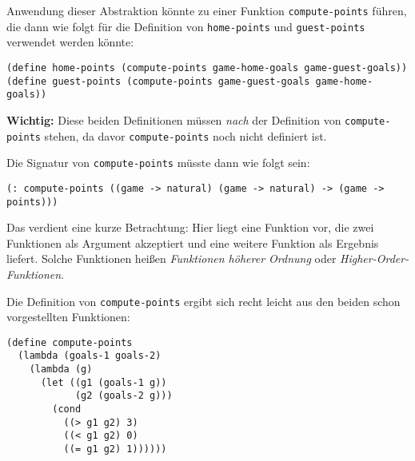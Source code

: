 Anwendung dieser Abstraktion könnte zu einer Funktion \texttt{compute-points}
führen, die dann wie folgt für die Definition von \texttt{home-points} und
\texttt{guest-points} verwendet werden könnte:

\begin{verbatim}
(define home-points (compute-points game-home-goals game-guest-goals))
(define guest-points (compute-points game-guest-goals game-home-goals))
\end{verbatim}
%
\textbf{Wichtig:} Diese beiden Definitionen müssen \emph{nach} der
Definition von \texttt{compute-points} stehen, da davor
\texttt{compute-points} noch nicht definiert ist.

Die Signatur von \texttt{compute-points} müsste dann wie folgt sein:
\begin{verbatim}
(: compute-points ((game -> natural) (game -> natural) -> (game -> points)))
\end{verbatim}
Das verdient eine kurze Betrachtung: Hier liegt eine Funktion vor, die zwei
Funktionen als Argument akzeptiert und eine weitere Funktion als Ergebnis
liefert. Solche Funktionen heißen \textit{Funktionen höherer Ordnung} oder
\textit{Higher-Order-Funktionen}. 

Die Definition von \texttt{compute-points} ergibt sich recht leicht aus den
beiden schon vorgestellten Funktionen:
\begin{verbatim}
(define compute-points
  (lambda (goals-1 goals-2)
    (lambda (g)
      (let ((g1 (goals-1 g))
            (g2 (goals-2 g)))
        (cond
          ((> g1 g2) 3)
          ((< g1 g2) 0)
          ((= g1 g2) 1))))))
\end{verbatim}

